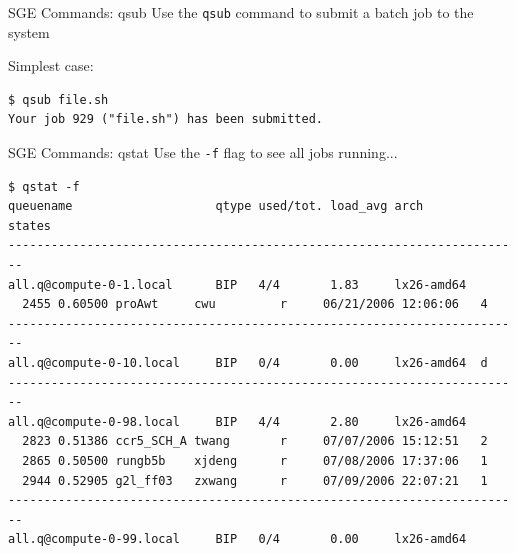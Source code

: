 \documentclass[pdf,contemporain,slideColor,nocolorBG,accumulate,nototal]{prosper}
\begin{document}

\begin{slide}{SGE Commands: qsub}
Use the {\tt qsub} command to submit a batch job to the system

Simplest case:
\tiny
\begin{verbatim}
$ qsub file.sh
Your job 929 ("file.sh") has been submitted.
\end{verbatim}
\end{slide}

\begin{slide}{SGE Commands: qstat}
Use the {\tt -f} flag to see all jobs running...
\tiny
\begin{verbatim}
$ qstat -f
queuename                    qtype used/tot. load_avg arch        states
------------------------------------------------------------------------
all.q@compute-0-1.local      BIP   4/4       1.83     lx26-amd64
  2455 0.60500 proAwt     cwu         r     06/21/2006 12:06:06   4
------------------------------------------------------------------------
all.q@compute-0-10.local     BIP   0/4       0.00     lx26-amd64  d
------------------------------------------------------------------------
all.q@compute-0-98.local     BIP   4/4       2.80     lx26-amd64
  2823 0.51386 ccr5_SCH_A twang       r     07/07/2006 15:12:51   2
  2865 0.50500 rungb5b    xjdeng      r     07/08/2006 17:37:06   1
  2944 0.52905 g2l_ff03   zxwang      r     07/09/2006 22:07:21   1
------------------------------------------------------------------------
all.q@compute-0-99.local     BIP   0/4       0.00     lx26-amd64
\end{verbatim}
\end{slide}
\end{document}
